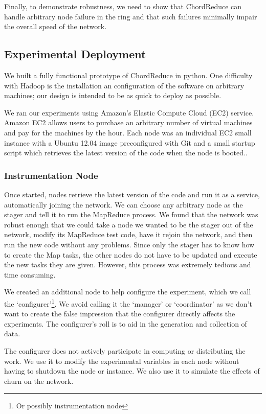 \documentclass[10pt, conference, compsocconf]{IEEEtran}
\begin{document}
Finally, to demonstrate robustness, we need to show that ChordReduce can handle arbitrary node failure in the ring and that such failures minimally impair the overall speed of the network.

\subsection{Experimental Deployment}
We built a fully functional prototype of ChordReduce in python.  One difficulty with Hadoop is the installation an configuration of the software on arbitrary machines;  our design is intended to be as quick to deploy as possible. 


We ran our experiments using Amazon's Elastic Compute Cloud (EC2) service.  Amazon EC2 allows users to purchase an arbitrary number of virtual machines and pay for the machines by the hour. Each node was an individual EC2 small instance \cite{amazon-instances} with a Ubuntu 12.04 image preconfigured with Git and a small startup script which retrieves the latest version of the code when the node is booted..  

\subsubsection*{Instrumentation Node}
Once started, nodes retrieve the latest version of the code and run it as a service, automatically joining the network.  We can choose any arbitrary node as the stager and tell it to run the MapReduce process. We found that the network was robust enough that we could take a node we wanted to be the stager out of the network, modify its MapReduce test code, have it rejoin the network, and then run the new code without any problems. Since only the stager has to know how to create the Map tasks, the other nodes do not have to be updated and execute the new tasks they are given.  However, this process was extremely tedious and time consuming.

We created an additional node to help configure the experiment, which we call the `configurer'\footnote{Or possibly instrumentation node}.  We avoid calling it the `manager' or `coordinator' as we don't want to create the false impression that the configurer directly affects the experiments.  The configurer's roll is to aid in the generation and collection of data. 

The configurer does not actively participate in computing or distributing the work.  We use it to modify the experimental variables in each node without having to shutdown the node or instance. We also use it to simulate the effects of churn on the network.
\end{document}
